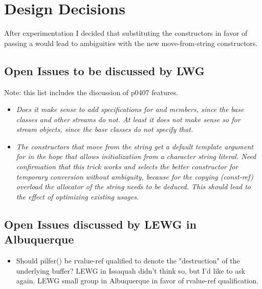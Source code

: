 \documentclass[ebook,11pt,article]{memoir}
\begin{document}
\chapter{Design Decisions}
After experimentation I decided that substituting the  constructors in favor of passing a  would lead to ambiguities with the new move-from-string constructors.
\section{Open Issues to be discussed by LWG}
Note: this list includes the discussion of p0407 features.
\begin{itemize}
\item \em{Does it make sense to add  specifications for  and  members, since the base classes and other streams do not. At least it does not make sense so for stream objects, since the base classes do not specify that.}
\item \em{The  constructors that move from the string get a default template argument for  in the hope that allows initialization from a character string literal. Need confirmation that this trick works and selects the better constructor for temporary conversion without ambiguity, because for the copying (const-ref) overload the allocator of the string needs to be deduced. This should lead to the effect of optimizing existing usages.}
\end{itemize}

\section{Open Issues discussed by LEWG in Albuquerque}
\begin{itemize}
\item Should pilfer() be rvalue-ref qualified to denote the "destruction" of the underlying buffer? LEWG in Issaquah didn't think so, but I'd like to ask again. LEWG small group in Albuquerque in favor of rvalue-ref qualification.
\end{itemize}
\end{document}
